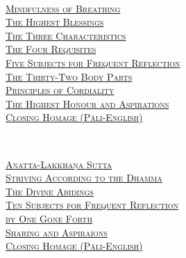 {\vfill
\hspace{0pt}
  \clearpage

  \vspace{1.5cm}

  {\libertinusFont\selectfont\textbf{\textsc{\fontsize{18}{12}\selectfont{}}}}\\

  \textsc{\fontsize{14.4}{28}\selectfont
    \hyperref[mindfulness-of-breathing]{Mindfulness of Breathing} \ifdesktopversion\else\pageref{mindfulness-of-breathing}\fi\\
    \hyperref[highest-blessings]{The Highest Blessings} \ifdesktopversion\else\pageref{highest-blessings}\fi\\
    \hyperref[three-characteristics]{The Three Characteristics} \ifdesktopversion\else\pageref{three-characteristics}\fi\\
    \hyperref[four-requisites]{The Four Requisites} \ifdesktopversion\else\pageref{four-requisites}\fi\\
    \hyperref[five-reflections]{Five Subjects for Frequent Reflection} \ifdesktopversion\else\pageref{five-reflections}\fi\\
    \hyperref[32-parts]{The Thirty-Two Body Parts} \ifdesktopversion\else\pageref{32-parts}\fi\\
    \hyperref[principles-of-cordiality]{Principles of Cordiality} \ifdesktopversion\else\pageref{principles-of-cordiality}\fi\\
    \hyperref[highest-honour-aspirations]{The Highest Honour and Aspirations} \ifdesktopversion\else\pageref{highest-honour-aspirations}\fi\\
    \hyperref[closing-homage]{Closing Homage (Pāli-English)} \ifdesktopversion\else\pageref{closing-homage}\fi\\
  }

  \vspace{1.5cm}

  {\libertinusFont\selectfont\textbf{\textsc{\fontsize{18}{12}\selectfont{}}}}\\

  \textsc{\fontsize{14.4}{28}\selectfont
    \hyperref[anatta-lakkhana]{Anatta-Lakkhaṇa Sutta} \ifdesktopversion\else\pageref{anatta-lakkhana}\fi\\
    \hyperref[striving-according-to-dhamma]{Striving According to the Dhamma} \ifdesktopversion\else\pageref{striving-according-to-dhamma}\fi\\
    \hyperref[divine-abidings]{The Divine Abidings} \ifdesktopversion\else\pageref{divine-abidings}\fi\\
    \hyperref[ten-reflections]{Ten Subjects for Frequent Reflection\\ by One Gone Forth} \ifdesktopversion\else\pageref{ten-reflections}\fi\\
    \hyperref[sharing-aspirations]{Sharing and Aspiraions} \ifdesktopversion\else\pageref{sharing-aspirations}\fi\\
    \hyperref[closing-homage]{Closing Homage (Pāli-English)} \ifdesktopversion\else\pageref{closing-homage}\fi\\
  }

}
